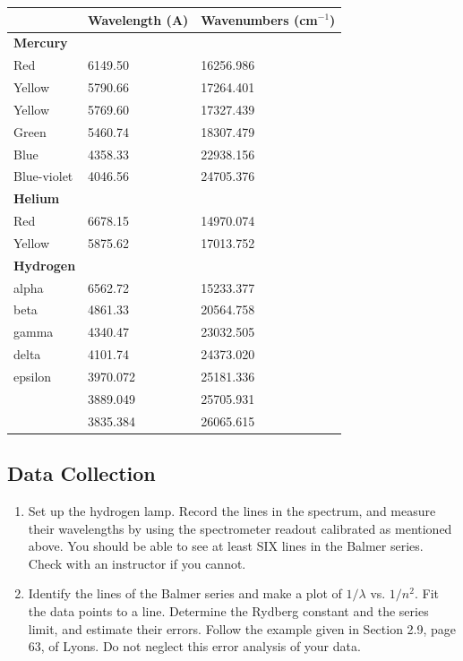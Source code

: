 \documentclass{../lab}
\begin{document}
\begin{center}
    \begin{tabular}{l|l|l}
         & Wavelength (A) & Wavenumbers (cm$^{-1}$) \\ \hline
        \textbf{Mercury}      &            &   \\ \hline
        Red          &  6149.50   &  16256.986 \\ \hline
        Yellow       &  5790.66   &  17264.401 \\ \hline
        Yellow       &  5769.60   &  17327.439 \\ \hline
        Green        &  5460.74   &  18307.479 \\ \hline
        Blue         &  4358.33   &  22938.156 \\ \hline
        Blue-violet  &  4046.56   &  24705.376 \\ \hline
        \textbf{Helium}       &            &   \\ \hline
        Red          &  6678.15   &  14970.074 \\ \hline
        Yellow       &  5875.62   &  17013.752 \\ \hline
        \textbf{Hydrogen}     &            &   \\ \hline
        alpha        &  6562.72   &  15233.377 \\ \hline
        beta         &  4861.33   &  20564.758 \\ \hline
        gamma        &  4340.47   &  23032.505 \\ \hline
        delta        &  4101.74   &  24373.020 \\ \hline
        epsilon      &  3970.072  &  25181.336 \\ \hline
                     &  3889.049  &  25705.931 \\ \hline
                     &  3835.384  &  26065.615 \\
    \end{tabular}
\end{center}

\subsection{Data Collection}

\begin{enumerate}
    \item Set up the hydrogen lamp. Record the lines in the spectrum, and measure their wavelengths by using the spectrometer readout calibrated as mentioned above. You should be able to see at least SIX lines in the Balmer series. Check with an instructor if you cannot.

    \item Identify the lines of the Balmer series and make a plot of $1/\lambda$ vs. $1/n^2$. Fit the data points to a line. Determine the Rydberg constant and the series limit, and estimate their errors. Follow the example given in Section 2.9, page 63, of Lyons. Do not neglect this error analysis of your data.

\end{enumerate}
\end{document}
